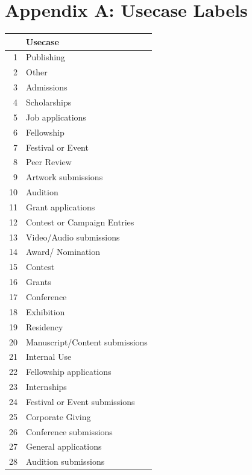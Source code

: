 \documentclass[12pt]{report}   %
\begin{document}
\chapter{Appendix A: Usecase Labels}
\label{app:usecase}
\begin{minipage}{0.5\textwidth}
\small
\centering
\begin{tabular}{rl}

  \hline
 & Usecase \\ 
  \hline
1 & Publishing \\ 
  2 & Other \\ 
  3 & Admissions \\ 
  4 & Scholarships \\ 
  5 & Job applications \\ 
  6 & Fellowship \\ 
  7 & Festival or Event \\ 
  8 & Peer Review \\ 
  9 & Artwork submissions \\ 
  10 & Audition \\ 
  11 & Grant applications \\ 
  12 & Contest or Campaign Entries \\ 
  13 & Video/Audio submissions \\ 
  14 & Award/ Nomination \\ 
  15 & Contest \\ 
  16 & Grants \\ 
  17 & Conference \\ 
  18 & Exhibition \\ 
  19 & Residency \\ 
  20 & Manuscript/Content submissions \\ 
  21 & Internal Use \\ 
  22 & Fellowship applications \\ 
  23 & Internships \\ 
  24 & Festival or Event submissions \\ 
  25 & Corporate Giving \\ 
  26 & Conference submissions \\ 
  27 & General applications \\ 
  28 & Audition submissions \\ 
   \hline
\end{tabular}
\end{minipage}

\newpage
\end{document}
